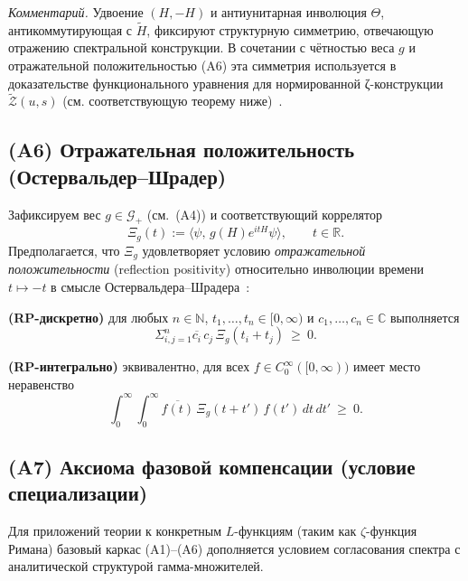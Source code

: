 \documentclass{article}
\numberwithin{equation}{section}
\theoremstyle{plain}
\theoremstyle{definition}
\theoremstyle{remark}
\def\infty{∞}\def\partial{∂}\def\sum{Σ}\def\int{∫}%
\begin{document}
\emph{Комментарий.}
Удвоение $(H,-H)$ и антиунитарная инволюция $\Theta$, антикоммутирующая с $\widetilde H$,
фиксируют структурную симметрию, отвечающую отражению спектральной конструкции.
В сочетании с чётностью веса $g$ и отражательной положительностью (A6) эта симметрия
используется в доказательстве функционального уравнения для нормированной ζ-конструкции
$\widetilde{\mathcal Z}(u,s)$ (см. соответствующую теорему ниже)~\cite{Wigner1931,BaezSegal2000}.


\subsection{(A6) Отражательная положительность (Остервальдер--Шрадер)}
\label{subsec:RP}

\noindent
Зафиксируем вес $g\in\mathcal G_{+}$ (см.~(A4)) и соответствующий коррелятор
\begin{equation}
\Xi_g(t):=\langle\psi,\,g(H)e^{itH}\psi\rangle,\qquad t\in\mathbb R.
\end{equation}
Предполагается, что $\Xi_g$ удовлетворяет условию \emph{отражательной положительности}
(reflection positivity) относительно инволюции времени $t\mapsto -t$
в смысле Остервальдера--Шрадера~\cite{OsterwalderSchrader1973}:

\medskip
\noindent
\textbf{(RP-дискретно)} для любых $n\in\mathbb N$, $t_1,\dots,t_n\in[0,\infty)$ и $c_1,\dots,c_n\in\mathbb C$ выполняется
\begin{equation}
\sum_{i,j=1}^{n}\overline{c_i}\,c_j\,\Xi_g(t_i+t_j)\ \ge\ 0.
\label{eq:QSSC-RP-discrete}
\end{equation}

\noindent
\textbf{(RP-интегрально)} эквивалентно, для всех $f\in C_0^\infty([0,\infty))$ имеет место неравенство
\begin{equation}
\int_{0}^{\infty}\!\!\int_{0}^{\infty}
\overline{f(t)}\,\Xi_g(t+t')\,f(t')\,dt\,dt'\ \ge\ 0.
\label{eq:QSSC-RP-integral}
\end{equation}


\subsection{(A7) Аксиома фазовой компенсации (условие специализации)}
\label{subsec:axiom_a7}

Для приложений теории к конкретным $L$-функциям (таким как $\zeta$-функция Римана) базовый каркас (A1)–(A6) дополняется условием согласования спектра с аналитической структурой гамма-множителей.
\end{document}
